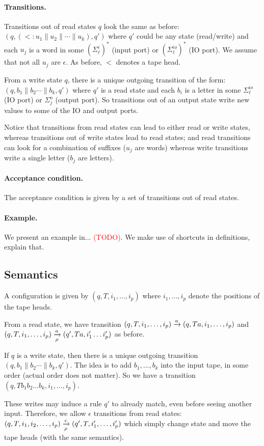 \paragraph*{Transitions.} Transitions out of read states $q$ look the same as before: $(q, (\lt: u_1 \parallel u_2 \parallel \cdots \parallel u_k), q')$ where $q'$ could be any state (read/write) and each $u_j$ is a word in some $(\Sigma^i_\ell)^*$ (input port) or $(\Sigma^{io}_\ell)^*$ (IO port).  We assume that not all $u_j$ are $\epsilon$. As before, $\lt$ denotes a tape head. 

From a write state $q$, there is a unique outgoing transition of the form: $(q, b_1 \parallel b_2 \cdots \parallel b_k, q')$ where $q'$ is a read state and each $b_i$ is a letter in some  $\Sigma^{io}_\ell$ (IO port) or $\Sigma^o_j$ (output port). So transitions out of an output state write new values to some of the IO and output ports.

Notice that transitions from read states can lead to either read or write states, whereas transitions out of write states lead to read states; and read transitions can look for a combination of suffixes ($u_j$ are words) whereas write transitions write a single letter ($b_j$ are letters).

\paragraph*{Acceptance condition.} The acceptance condition is given by a set of transitions out of read states.

\paragraph*{Example.} We present an example in... \textcolor{red}{(TODO)}. We make use of shortcuts in definitions, explain that.

\subsection{Semantics}

A configuration is given by $(q, T, i_1, \dots, i_p)$ where $i_1, \dots, i_p$ denote the positions of the tape heads. 

From a read state, we have transition $(q, T, i_1, \dots, i_p) \xrightarrow{a} (q, Ta, i_1, \dots, i_p)$ and $(q, T, i_1, \dots, i_p) \xrightarrow[\rho]{a} (q', Ta, i'_1 \dots i'_p)$ as before. 

If $q$ is a write state, then there is a unique outgoing transition $(q, b_1 \parallel b_2 \cdots \parallel b_k, q')$. The idea is to add $b_1, \dots, b_k$ into the input tape, in some order (actual order does not matter). So we have a transition $(q, Tb_1 b_2 \dots b_k, i_1, \dots, i_p)$.


These writes may induce a rule $q'$ to already match, even before seeing another input. Therefore, we allow $\epsilon$ transitions from read states: $(q, T, i_1, i_2, \dots, i_p) \xrightarrow[\rho]{\epsilon} (q', T, i'_1, \dots, i'_p)$ which simply change state and move the tape heads (with the same semantics). 